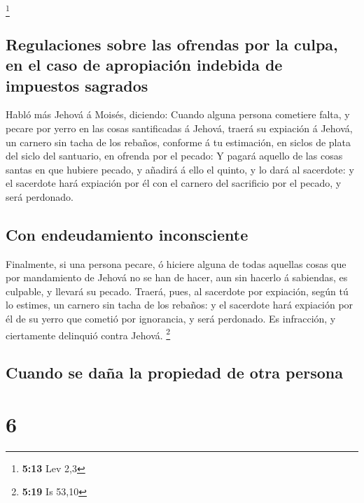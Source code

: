 \footnote{\textbf{5:13} Lev 2,3}

\hypertarget{regulaciones-sobre-las-ofrendas-por-la-culpa-en-el-caso-de-apropiaciuxf3n-indebida-de-impuestos-sagrados}{%
\subsection{Regulaciones sobre las ofrendas por la culpa, en el caso de
apropiación indebida de impuestos
sagrados}\label{regulaciones-sobre-las-ofrendas-por-la-culpa-en-el-caso-de-apropiaciuxf3n-indebida-de-impuestos-sagrados}}

 Habló más Jehová á Moisés, diciendo: 
Cuando alguna persona cometiere falta, y pecare por yerro en las cosas
santificadas á Jehová, traerá su expiación á Jehová, un carnero sin
tacha de los rebaños, conforme á tu estimación, en siclos de plata del
siclo del santuario, en ofrenda por el pecado:  Y pagará
aquello de las cosas santas en que hubiere pecado, y añadirá á ello el
quinto, y lo dará al sacerdote: y el sacerdote hará expiación por él con
el carnero del sacrificio por el pecado, y será perdonado.

\hypertarget{con-endeudamiento-inconsciente}{%
\subsection{Con endeudamiento
inconsciente}\label{con-endeudamiento-inconsciente}}

 Finalmente, si una persona pecare, ó hiciere alguna de
todas aquellas cosas que por mandamiento de Jehová no se han de hacer,
aun sin hacerlo á sabiendas, es culpable, y llevará su pecado.
 Traerá, pues, al sacerdote por expiación, según tú lo
estimes, un carnero sin tacha de los rebaños: y el sacerdote hará
expiación por él de su yerro que cometió por ignorancia, y será
perdonado.  Es infracción, y ciertamente delinquió contra
Jehová. \footnote{\textbf{5:19} Is 53,10}

\hypertarget{cuando-se-dauxf1a-la-propiedad-de-otra-persona}{%
\subsection{Cuando se daña la propiedad de otra
persona}\label{cuando-se-dauxf1a-la-propiedad-de-otra-persona}}

\hypertarget{section-5}{%
\section{6}\label{section-5}}

